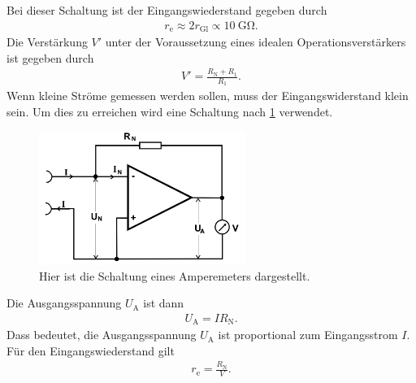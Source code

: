 Bei dieser Schaltung ist der Eingangswiederstand gegeben durch
\begin{align}
	r_\text{e}\approx 2r_\text{Gl}\propto \SI{10}{\giga\ohm}.
\end{align}
Die Verstärkung $V'$ unter der Voraussetzung eines idealen Operationsverstärkers ist gegeben durch
\begin{align}
	V'=\frac{R_\text{N}+R_1}{R_1 }.
\end{align}
\indent
Wenn kleine Ströme gemessen werden sollen, muss der Eingangswiderstand klein sein.
Um dies zu erreichen wird eine Schaltung nach \cref{fig:Amperemeter} verwendet.
\begin{figure}[h!]
	\centering
	\includegraphics[width = 0.6\textwidth]{../Grafiken/Amperemeter.png}
	\caption{Hier ist die Schaltung eines Amperemeters dargestellt. \cite{V51}\label{fig:Amperemeter}}
\end{figure}
\FloatBarrier
Die Ausgangsspannung $U_\text{A}$ ist dann
\begin{align}
	U_\text{A}=IR_\text{N}.\label{eq:amperemeter_strom}
\end{align}
Dass bedeutet, die Ausgangsspannung $U_\text{A}$ ist proportional zum Eingangsstrom $I$.
Für den Eingangswiederstand gilt\\
\begin{align*}
	r_\text{e}=\frac{R_\text{N}}{V}.
	\label{eq:eingangswiderstand}
\end{align*}
